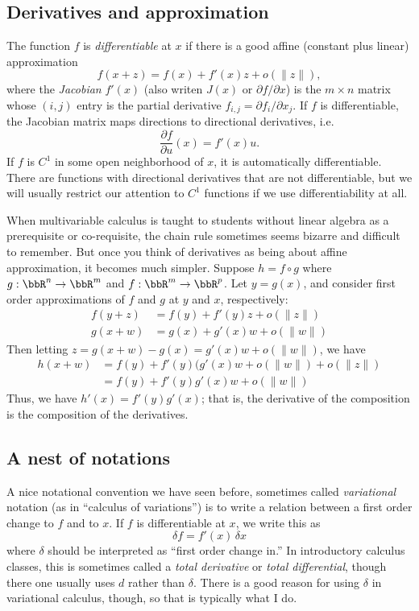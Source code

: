 \documentclass[12pt, leqno]{article} %
\begin{document}
\subsection*{Derivatives and approximation}


The function $f$ is {\em differentiable} at $x$ if there is a good
affine (constant plus linear) approximation
\[
  f(x+z) = f(x) + f'(x) z + o(\|z\|),
\]
where the {\em Jacobian} $f'(x)$ (also writen $J(x)$ or
$\partial f/\partial x$) is the $m \times n$ matrix whose $(i,j)$ entry
is the partial derivative $f_{i,j} = \partial f_i / \partial x_j$.
If $f$ is differentiable, the Jacobian matrix maps directions to directional
derivatives, i.e.
\[
  \frac{\partial f}{\partial u}(x) = f'(x) u.
\]
If $f$ is $C^1$ in some open neighborhood of $x$, it is automatically
differentiable.  There are functions with directional derivatives
that are not differentiable, but we will usually restrict our
attention to $C^1$ functions if we use differentiability at all.

When multivariable calculus is taught to students without linear
algebra as a prerequisite or co-requisite, the chain rule sometimes
seems bizarre and difficult to remember.  But once you think of
derivatives as being about affine approximation, it becomes much
simpler.  Suppose $h = f \circ g$ where
$g : \bbR^n \rightarrow \bbR^m$ and
$f : \bbR^m \rightarrow \bbR^p$.
Let $y = g(x)$, and consider first order approximations of $f$ and $g$
at $y$ and $x$, respectively:
\begin{align*}
  f(y+z) &= f(y) + f'(y) z + o(\|z\|) \\
  g(x+w) &= g(x) + g'(x) w + o(\|w\|)
\end{align*}
Then letting $z = g(x+w) - g(x) = g'(x) w + o(\|w\|)$, we have
\begin{align*}
  h(x+w)
  &= f(y) + f'(y) (g'(x) w + o(\|w\|) + o(\|z\|) \\
  &= f(y) + f'(y) g'(x) w + o(\|w\|)
\end{align*}
Thus, we have $h'(x) = f'(y) g'(x)$; that is, the derivative of the
composition is the composition of the derivatives.

\subsection*{A nest of notations}

A nice notational convention we have seen before, sometimes called
{\em variational} notation (as in ``calculus of variations'') is to
write a relation between a first order change to $f$ and to $x$.
If $f$ is differentiable at $x$, we write this as 
\[
  \delta f = f'(x) \, \delta x
\]
where $\delta$ should be interpreted as ``first order change in.''
In introductory calculus classes, this is sometimes called a
{\em total derivative} or {\em total differential}, though there one
usually uses $d$ rather than $\delta$.  There is a good reason for
using $\delta$ in variational calculus, though, so that is typically
what I do.
\end{document}
